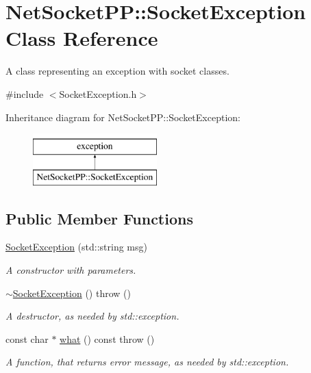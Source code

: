 \hypertarget{class_net_socket_p_p_1_1_socket_exception}{\section{Net\-Socket\-P\-P\-:\-:Socket\-Exception Class Reference}
\label{class_net_socket_p_p_1_1_socket_exception}
}


A class representing an exception with socket classes.  




{\ttfamily \#include $<$Socket\-Exception.\-h$>$}

Inheritance diagram for Net\-Socket\-P\-P\-:\-:Socket\-Exception\-:\begin{figure}[H]
\begin{center}
\leavevmode
\includegraphics[height=2.000000cm]{class_net_socket_p_p_1_1_socket_exception}
\end{center}
\end{figure}
\subsection*{Public Member Functions}
\begin{DoxyCompactItemize}
\item 
\hyperlink{class_net_socket_p_p_1_1_socket_exception_a7fe2e86c1775289a581156141ec3fb38}{Socket\-Exception} (std\-::string msg)
\begin{DoxyCompactList}\small\item\em A constructor with parameters. \end{DoxyCompactList}\item 
\hypertarget{class_net_socket_p_p_1_1_socket_exception_a659557c899329aea01977c980c4db9b9}{\hyperlink{class_net_socket_p_p_1_1_socket_exception_a659557c899329aea01977c980c4db9b9}{$\sim$\-Socket\-Exception} ()  throw ()}\label{class_net_socket_p_p_1_1_socket_exception_a659557c899329aea01977c980c4db9b9}

\begin{DoxyCompactList}\small\item\em A destructor, as needed by std\-::exception. \end{DoxyCompactList}\item 
const char $\ast$ \hyperlink{class_net_socket_p_p_1_1_socket_exception_a06b7b3f186976bb5ec7e7bf007c4f0ac}{what} () const   throw ()
\begin{DoxyCompactList}\small\item\em A function, that returns error message, as needed by std\-::exception. \end{DoxyCompactList}\end{DoxyCompactItemize}


